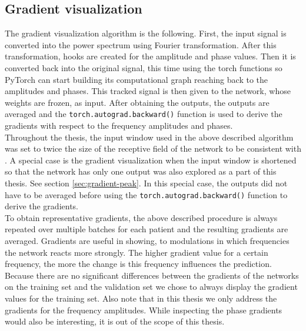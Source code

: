 \subsection{Gradient visualization}\label{subsec:gradinet-visualization}
The gradient visualization algorithm is the following.
First, the input signal is converted into the power spectrum using Fourier transformation.
After this transformation, hooks are created for the amplitude and phase values.
Then it is converted back into the original signal, this time using the torch functions so PyTorch can start building its computational graph reaching back to the amplitudes and phases.
This tracked signal is then given to the network, whose weights are frozen, as input.
After obtaining the outputs, the outputs are averaged and the \texttt{torch.autograd.backward()} function is used to derive the gradients with respect to the frequency amplitudes and phases. \\

Throughout the thesis, the input window used in the above described algorithm was set to twice the size of the receptive field of the network to be consistent with \cite{Hammer_2021}.
A special case is the gradient visualization when the input window is shortened so that the network has only one output was also explored as a part of this thesis.
See section \ref{sec:gradient-peak}.
In this special case, the outputs did not have to be averaged before using the \texttt{torch.autograd.backward()} function to derive the gradients. \\

To obtain representative gradients, the above described procedure is always repeated over multiple batches for each patient and the resulting gradients are averaged.
Gradients are useful in showing, to modulations in which frequencies the network reacts more strongly. 
The higher gradient value for a certain frequency, the more the change is this frequency influences the prediction. \\
 
Because there are no significant differences between the gradients of the networks on the training set and the validation set we chose to always display the gradient values for the training set.
Also note that in this thesis we only address the gradients for the frequency amplitudes.
While inspecting the phase gradients would also be interesting, it is out of the scope of this thesis.


